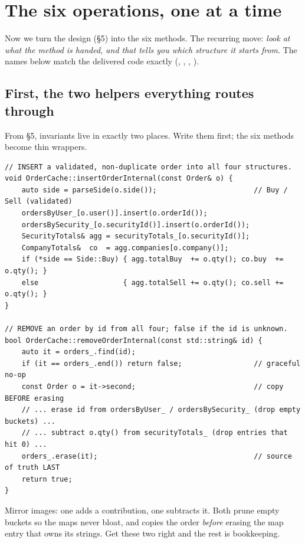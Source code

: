 \section{The six operations, one at a time}

Now we turn the design (\S5) into the six methods. The recurring move: \emph{look
at what the method is handed, and that tells you which structure it starts from}.
The names below match the delivered code exactly (,
, , ).

\subsection{First, the two helpers everything routes through}

From \S5, invariants live in exactly two places. Write them first; the six methods
become thin wrappers.

\begin{lstlisting}
// INSERT a validated, non-duplicate order into all four structures.
void OrderCache::insertOrderInternal(const Order& o) {
    auto side = parseSide(o.side());                       // Buy / Sell (validated)
    ordersByUser_[o.user()].insert(o.orderId());
    ordersBySecurity_[o.securityId()].insert(o.orderId());
    SecurityTotals& agg = securityTotals_[o.securityId()];
    CompanyTotals&  co  = agg.companies[o.company()];
    if (*side == Side::Buy) { agg.totalBuy  += o.qty(); co.buy  += o.qty(); }
    else                    { agg.totalSell += o.qty(); co.sell += o.qty(); }
}

// REMOVE an order by id from all four; false if the id is unknown.
bool OrderCache::removeOrderInternal(const std::string& id) {
    auto it = orders_.find(id);
    if (it == orders_.end()) return false;                 // graceful no-op
    const Order o = it->second;                            // copy BEFORE erasing
    // ... erase id from ordersByUser_ / ordersBySecurity_ (drop empty buckets) ...
    // ... subtract o.qty() from securityTotals_ (drop entries that hit 0) ...
    orders_.erase(it);                                     // source of truth LAST
    return true;
}
\end{lstlisting}

\begin{intu}
Mirror images: one adds a contribution, one subtracts it. Both prune empty
buckets so the maps never bloat, and  copies the order
\emph{before} erasing the map entry that owns its strings. Get these two right and
the rest is bookkeeping.
\end{intu}

